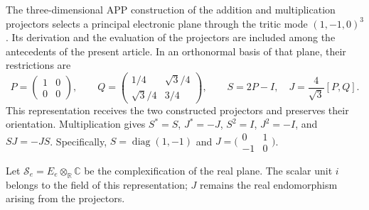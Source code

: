The three-dimensional APP construction of the addition and
multiplication projectors selects a principal electronic plane through the
tritic mode $(1,-1,0)^3$. Its derivation and the evaluation of the
projectors are included among the antecedents of the present
article. In an orthonormal basis of that plane, their restrictions
are
\begin{equation}
 P=\begin{pmatrix}1&0\\0&0\end{pmatrix},\qquad
 Q=\begin{pmatrix}1/4&\sqrt3/4\\\sqrt3/4&3/4\end{pmatrix},
 \qquad S=2P-I,\quad J=\frac4{\sqrt3}[P,Q].
 \label{vi:eq:bloque-electronico}
\end{equation}
This representation receives the two constructed projectors and
preserves their orientation. Multiplication gives
$S^*=S$, $J^*=-J$, $S^2=I$, $J^2=-I$, and $SJ=-JS$.
Specifically, $S=\operatorname{diag}(1,-1)$ and
$J=\bigl(\begin{smallmatrix}0&1\\-1&0\end{smallmatrix}\bigr)$.

Let $\mathscr S_e=E_e\otimes_{\mathbb R}\mathbb C$ be the
complexification of the real plane. The scalar unit $i$ belongs
to the field of this representation; $J$ remains the real
endomorphism arising from the projectors.

